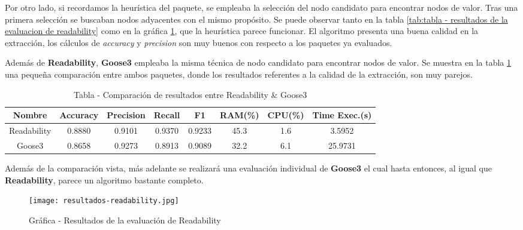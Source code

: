 Por otro lado, si recordamos la heurística del paquete, se empleaba la selección del nodo candidato para
encontrar nodos de valor. Tras una primera selección se buscaban nodos adyacentes con el mismo propósito.
Se puede observar tanto en la tabla \ref{tab:tabla - resultados de la evaluacion de readability} como en
la gráfica \ref{img:grafica - resultados de la evaluacion de readability}, que la heurística parece funcionar.
El algoritmo presenta una buena calidad en la extracción, los cálculos de \emph{accuracy} y \emph{precision}
son muy buenos con respecto a los paquetes ya evaluados.

Además de \textbf{Readability}, \textbf{Goose3} empleaba la misma técnica de nodo candidato para encontrar
nodos de valor. Se muestra en la tabla \ref{tab:tabla - comparacion de resultados entre readability y goose3} 
una pequeña comparación entre ambos paquetes, donde los resultados referentes a la calidad de la extracción, 
son muy parejos.

\begin{table}[h]
    \begin{center}
      \begin{tabular}{| c | c | c | c | c | c | c | c |} \hline 
       \textbf{Nombre} & \textbf{Accuracy} & \textbf{Precision}  & \textbf{Recall} & \textbf{F1} & \textbf{RAM(\%)} & \textbf{CPU(\%)} & \textbf{Time Exec.(s)} \\ \hline
       Readability & 0.8880 & 0.9101 & 0.9370 & 0.9233 & 45.3 & 1.6 & 3.5952 \\ \hline
       Goose3 & 0.8658 & 0.9273 & 0.8913 & 0.9089 & 32.2 & 6.1 & 25.9731 \\ \hline
      \end{tabular}
      \caption{Tabla - Comparación de resultados entre Readability \& Goose3}
      \label{tab:tabla - comparacion de resultados entre readability y goose3}
    \end{center}
\end{table}

Además de la comparación vista, más adelante se realizará una evaluación individual de \textbf{Goose3} el
cual hasta entonces, al igual que \textbf{Readability}, parece un algoritmo bastante completo.

\begin{figure}[tphb]
    \centering
    \texttt{[image: resultados-readability.jpg]}
    \caption{Gráfica - Resultados de la evaluación de Readability}
    \label{img:grafica - resultados de la evaluacion de readability}
\end{figure}

